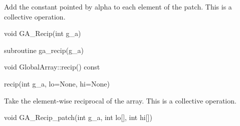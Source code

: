 \documentclass[12pt]{article}
\begin{document}
\gcoll

\begin{desc}

Add the constant pointed by alpha to each element of the patch.
This is a collective operation.
\end{desc}


\begin{capi}
\begin{ccode}
void GA_Recip(int g_a)
\end{ccode}
\begin{funcargs}
\end{funcargs}
\end{capi}

\begin{fapi}
\begin{fcode}
subroutine ga_recip(g_a)
\end{fcode}
\begin{funcargs}
\end{funcargs}
\end{fapi}

\begin{cxxapi}
\begin{cxxcode}
void GlobalArray::recip() const
\end{cxxcode}
\end{cxxapi}

\begin{pyapi}
\begin{pycode}
recip(int g_a, lo=None, hi=None)
\end{pycode}
\end{pyapi}
\gcoll

\begin{desc}

Take the element-wise reciprocal of the array.
This is a collective operation.
\end{desc}


\begin{capi}
\begin{ccode}
void GA_Recip_patch(int g_a, int lo[], int hi[])
\end{ccode}
\begin{funcargs}
\end{funcargs}
\end{capi}
\end{document}

